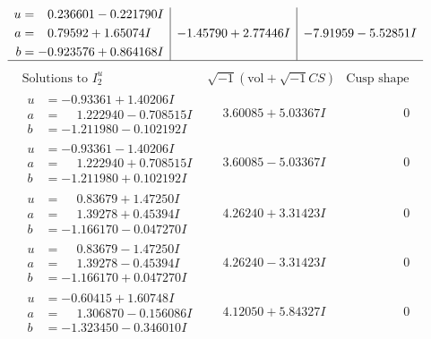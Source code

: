 \documentclass[1p]{elsarticle_modified}
\theoremstyle{definition}
\newcommand{\I}{\sqrt{-1}}
\begin{document}
$$\begin{array}{c|c|c}
\begin{aligned}
u &= \phantom{-}0.236601 - 0.221790 I \\
a &= \phantom{-}0.79592 + 1.65074 I \\
b &= -0.923576 + 0.864168 I\end{aligned}
 & -1.45790 + 2.77446 I & -7.91959 - 5.52851 I\\
 \hline 
 \end{array}$$\newpage$$\begin{array}{c|c|c}  
\text{Solutions to }I^u_{2}& \I (\text{vol} + \sqrt{-1}CS) & \text{Cusp shape}\\
 \hline 
\begin{aligned}
u &= -0.93361 + 1.40206 I \\
a &= \phantom{-}1.222940 - 0.708515 I \\
b &= -1.211980 - 0.102192 I\end{aligned}
 & \phantom{-}3.60085 + 5.03367 I & \phantom{-0.000000 } 0 \\ \hline\begin{aligned}
u &= -0.93361 - 1.40206 I \\
a &= \phantom{-}1.222940 + 0.708515 I \\
b &= -1.211980 + 0.102192 I\end{aligned}
 & \phantom{-}3.60085 - 5.03367 I & \phantom{-0.000000 } 0 \\ \hline\begin{aligned}
u &= \phantom{-}0.83679 + 1.47250 I \\
a &= \phantom{-}1.39278 + 0.45394 I \\
b &= -1.166170 - 0.047270 I\end{aligned}
 & \phantom{-}4.26240 + 3.31423 I & \phantom{-0.000000 } 0 \\ \hline\begin{aligned}
u &= \phantom{-}0.83679 - 1.47250 I \\
a &= \phantom{-}1.39278 - 0.45394 I \\
b &= -1.166170 + 0.047270 I\end{aligned}
 & \phantom{-}4.26240 - 3.31423 I & \phantom{-0.000000 } 0 \\ \hline\begin{aligned}
u &= -0.60415 + 1.60748 I \\
a &= \phantom{-}1.306870 - 0.156086 I \\
b &= -1.323450 - 0.346010 I\end{aligned}
 & \phantom{-}4.12050 + 5.84327 I & \phantom{-0.000000 } 0 \\ \hline\begin{aligned}

\end{aligned}
\end{array}$$
\end{document}
